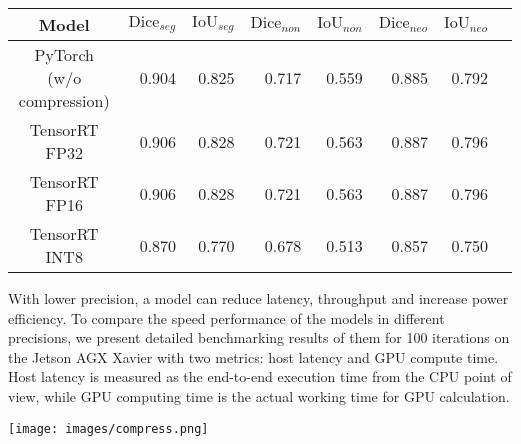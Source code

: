 \documentclass{ieeeaccess}
\newcommand{\DHA}{BlazeNeo-DHA\xspace}
\newcommand{\CleanDatasetName}{NeoPolyp-Clean\xspace}
\begin{document}
\begin{table*}[ht!]
    \centering
    \caption{Accuracy metrics on the \CleanDatasetName test set for \DHA models in different precisions}
    \label{tab:compress_acc}
    \begin{tabular}{@{} c | r r r r r r r@{}}
        \toprule
        
        \multicolumn{1}{c|}{Model} & \multicolumn{1}{c}{$\text{Dice}_{seg}$} & \multicolumn{1}{c}{$\text{IoU}_{seg}$} & \multicolumn{1}{c}{$\text{Dice}_{non}$} & \multicolumn{1}{c}{$\text{IoU}_{non}$} & \multicolumn{1}{c}{$\text{Dice}_{neo}$} & \multicolumn{1}{c}{$\text{IoU}_{neo}$} \\
        \midrule
        \midrule
        PyTorch (w/o compression)                   & 0.904                                   & 0.825                                  & 0.717                                   & 0.559                                  & 0.885                                   & 0.792                                  \\
        TensorRT FP32              & 0.906                                   & 0.828                                  & 0.721                                   & 0.563                                  & 0.887                                   & 0.796                                  \\
        TensorRT FP16              & 0.906                                   & 0.828                                  & 0.721                                   & 0.563                                  & 0.887                                   & 0.796                                  \\
        TensorRT INT8              & 0.870                                   & 0.770                                  & 0.678                                   & 0.513                                  & 0.857                                   & 0.750                                  \\
        
        \bottomrule
    \end{tabular}
\end{table*}

With lower precision, a model can reduce latency, throughput and increase power efficiency. To compare the speed performance of the models in different precisions, we present detailed benchmarking results of them for 100 iterations on the Jetson AGX Xavier with two metrics: host latency and GPU compute time. Host latency is measured as the end-to-end execution time from the CPU point of view, while GPU computing time is the actual working time for GPU calculation.
\begin{figure*}[ht!]
    \begin{center}
        \texttt{[image: images/compress.png]}
    \end{center}
    \caption{Qualitative comparison of \DHA models in different precisions: (a) image, (b) ground truth, (c) Pytorch, (d) TensorRT FP32, (e) TensorRT FP16, (f) TensorRT INT8.}
    \label{fig:compress}
\end{figure*}
\end{document}
